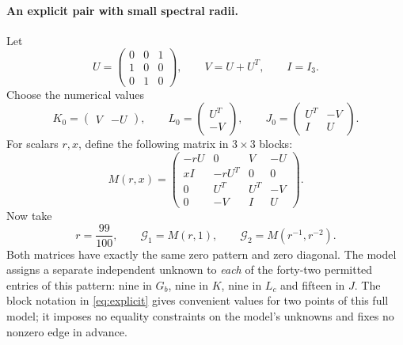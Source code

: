 \documentclass[11pt,a4paper]{article}
\begin{document}
\paragraph{An explicit pair with small spectral radii.}
Let
\[
 U=\begin{pmatrix}0&0&1\\1&0&0\\0&1&0\end{pmatrix},\qquad
 V=U+U^T,\qquad I=I_3.
\]
Choose the numerical values
\[
 K_0=\begin{pmatrix}V&-U\end{pmatrix},\qquad
 L_0=\begin{pmatrix}U^T\\-V\end{pmatrix},\qquad
 J_0=\begin{pmatrix}U^T&-V\\I&U\end{pmatrix}.
\]
For scalars $r,x$, define the following matrix in $3\times3$ blocks:
\begin{equation}\label{eq:explicit}
 M(r,x)=\begin{pmatrix}
 -rU&0&V&-U\\
 xI&-rU^T&0&0\\
 0&U^T&U^T&-V\\
 0&-V&I&U
 \end{pmatrix}.
\end{equation}
Now take
\begin{equation}\label{eq:pair}
 r=\frac{99}{100},\qquad
 \mathcal G_1=M(r,1),\qquad
 \mathcal G_2=M(r^{-1},r^{-2}).
\end{equation}
Both matrices have exactly the same zero pattern and zero diagonal. The
model assigns a separate independent unknown to \emph{each} of the forty-two
permitted entries of this pattern: nine in $G_b$, nine in $K$, nine in $L_c$
and fifteen in $J$. The block notation in \eqref{eq:explicit} gives convenient
values for two points of this full model; it imposes no equality constraints
on the model's unknowns and fixes no nonzero edge in advance.
\end{document}
